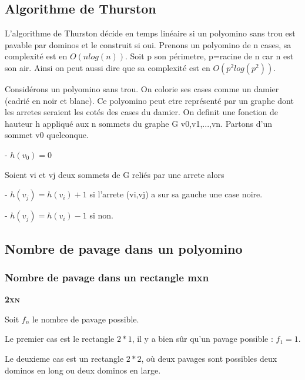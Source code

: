 \documentclass{article}
\begin{document}
\newpage

\subsection{Algorithme de Thurston}

L'algorithme de Thurston décide en temps linéaire si un polyomino sans trou est pavable par dominos et le construit si oui.
Prenons un polyomino de n cases, sa complexité est en $O\left ( nlog\left ( n \right ) \right )$. Soit p son périmetre, p=racine de n car n est son air.
Ainsi on peut aussi dire que sa complexité est en $O\left ( p^{2}log\left ( p^{2} \right ) \right )$.

Considérons un polyomino sans trou. On colorie ses cases comme un damier (cadrié en noir et blanc). Ce polyomino peut etre représenté par un graphe dont les arretes seraient les cotés des cases du damier.
On definit une fonction de hauteur h appliqué aux n sommets du graphe G {v0,v1,...,vn}.
Partons d'un sommet v0 quelconque.

- $h\left ( v_{0} \right )= 0$

Soient vi et vj deux sommets de G reliés par une arrete alors

- $h\left ( v_{j} \right )= h\left ( v_{i} \right ) + 1$ si l'arrete (vi,vj) a sur sa gauche une case noire.

- $h\left ( v_{j} \right )= h\left ( v_{i} \right ) - 1$ si non.




\newpage

\subsection{Nombre de pavage dans un polyomino}

\hspace{1cm}

\subsubsection{Nombre de pavage dans un rectangle mxn}

\hspace{1.5cm}

\textbf{\textsc{2xn}}

Soit $f_{n}$ le nombre de pavage possible.

Le premier cas est le rectangle $2*1$, il y a bien sûr qu’un pavage possible : $f_{1} = 1$.

Le deuxieme cas est un rectangle $2*2$, où deux pavages sont possibles deux dominos en long ou deux dominos en large.
\end{document}
